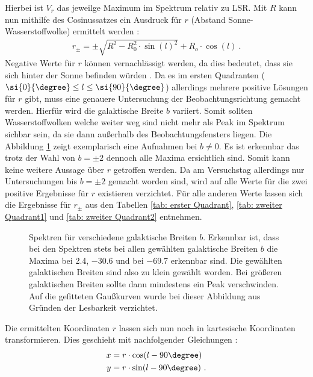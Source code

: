 Hierbei ist $V_r$ das jeweilge Maximum im Spektrum relativ zu LSR.\newline
Mit $R$ kann nun mithilfe des Cosinussatzes ein Ausdruck für $r$ (Abstand Sonne-Wasserstoffwolke) ermittelt werden \cite{H1}:
\begin{align}
    r_{\pm} = \pm \sqrt{R^2 - R_0^2 \cdot \sin(l)^2} + R_o \cdot \cos(l) \ .
    \label{eq:Berechnungr}
\end{align}
Negative Werte für $r$ können vernachlässigt werden, da dies bedeutet, dass sie sich hinter der Sonne befinden würden \cite{H1}. Da es im ersten Quadranten ($ \si{0}{\degree} \le l \le \si{90}{\degree}$) allerdings mehrere positive Lösungen für $r$ gibt, muss eine genauere Untersuchung der Beobachtungsrichtung gemacht werden. Hierfür wird die galaktische Breite $b$ variiert. Somit sollten Wasserstoffwolken welche weiter weg sind nicht mehr als Peak im Spektrum sichbar sein, da sie dann außerhalb des Beobachtungsfensters liegen. Die Abbildung \ref{fig:bungleichnull} zeigt exemplarisch eine Aufnahmen bei $b \neq 0$. Es ist erkennbar das trotz der Wahl von $b = \pm 2$ dennoch alle Maxima ersichtlich sind. Somit kann keine weitere Aussage über $r$ getroffen werden. Da am Versuchstag allerdings nur Untersuchungen bis $b = \pm 2$ gemacht worden sind, wird auf alle Werte für die zwei positive Ergebnisse für $r$ existieren verzichtet. Für alle anderen Werte lassen sich die Ergebnisse für $r_{\pm}$ aus den Tabellen \ref{tab: erster Quadrant}, \ref{tab: zweiter Quadrant1} und \ref{tab: zweiter Quadrant2} entnehmen.
\begin{figure}[H]
    \centering
       
    \caption[Spektren für verschiedene galaktische Breiten $b$]{Spektren für verschiedene galaktische Breiten $b$. Erkennbar ist, dass bei den Spektren stets bei allen gewählten galaktische Breiten $b$ die Maxima bei \SI{2.4}{}, \SI{-30.6}{} und bei \SI{-69.7}{} erkennbar sind. Die gewählten galaktischen Breiten sind also zu klein gewählt worden. Bei größeren galaktischen Breiten sollte dann mindestens ein Peak verschwinden. Auf die gefitteten Gaußkurven wurde bei dieser Abbildung aus Gründen der Lesbarkeit verzichtet.}
    \label{fig:bungleichnull}
\end{figure}
Die ermittelten Koordinaten $r$ lassen sich nun noch in kartesische Koordinaten transformieren. Dies geschieht mit nachfolgender Gleichungen \cite{H1}:
\begin{align}
    x &= r \cdot \cos(l-90\degree) \\
    y &= r \cdot \sin(l-90\degree) \ .
    \label{eq:umrechnung}
\end{align}
